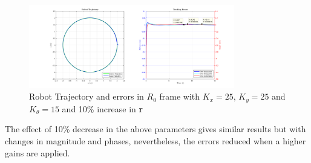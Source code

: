 \documentclass{article}
\begin{document}
\begin{figure}[H]
\centering
\includegraphics[width = 0.8\textwidth]{Figures/figure16.png}
\caption{  Robot Trajectory and errors in $R_{0}$ frame with $K_{x}=25$, $K_{y}=25$ and $K_{\theta}=15$ and 10\% increase in \textbf{r}  }
\label{fig:figure15}
\end{figure}
The effect of 10\% decrease in the above parameters gives similar results but with changes in magnitude and phases, nevertheless, the errors reduced when a higher gains are applied.
\end{document}
